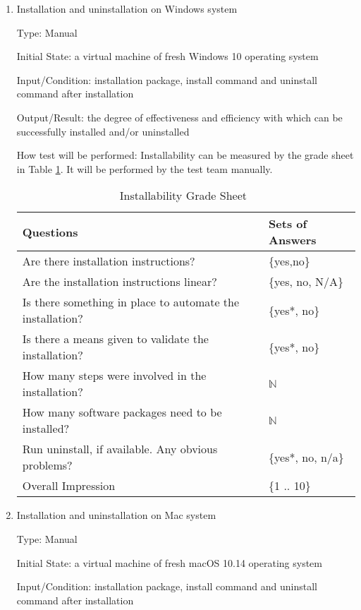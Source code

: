 \documentclass[12pt, titlepage]{article}
\begin{document}
\begin{enumerate}

\item{Installation and uninstallation on Windows system}
\label{sec_InstallWindows}

Type: Manual
					
Initial State: a virtual machine of fresh Windows 10 operating system
					
Input/Condition: \progname{} installation package, install command and
uninstall command after installation
					
Output/Result: the degree of effectiveness and efficiency with which
\progname{}can be successfully installed and/or uninstalled
					
How test will be performed: Installability can be measured by the grade sheet
in Table \ref{Tb_installability}. It will be performed by the test team manually.

\begin{table}[h]
\begin{tabular}{@{}ll@{}}
\toprule
Questions & Sets of Answers \\ \midrule
Are there installation instructions? & \{yes,no\} \\
Are the installation instructions linear? & \{yes, no, N/A\} \\
Is there something in place to automate the installation? & \{yes*, no\} \\
Is there a means given to validate the installation? & \{yes*, no\} \\
How many steps were involved in the installation? & $\mathbb{N}$ \\
How many software packages need to be installed? & $\mathbb{N}$ \\
Run uninstall, if available. Any obvious problems? & \{yes*, no, n/a\} \\
Overall Impression & \{1 .. 10\}\\ \bottomrule
\end{tabular}
\caption{Installability Grade Sheet~\cite{SmithEtAl2018}}
\label{Tb_installability}
\end{table}

\item{Installation and uninstallation on Mac system}

Type: Manual
					
Initial State: a virtual machine of fresh macOS 10.14 operating system
					
Input/Condition: \progname{} installation package, install command and
uninstall command after installation
					

\end{enumerate}
\end{document}
